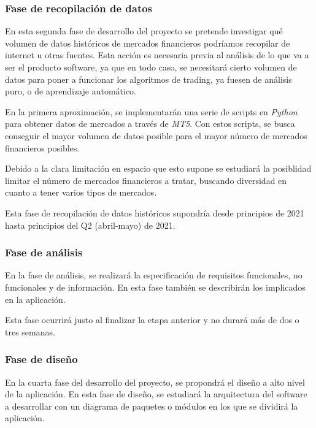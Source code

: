 \subsubsection{Fase de recopilación de datos}

En esta segunda fase de desarrollo del proyecto se pretende investigar qué volumen de datos históricos de mercados financieros podríamos recopilar de internet u otras fuentes. Esta acción es necesaria previa al análisis de lo que va a ser el producto software, ya que en todo caso, se necesitará cierto volumen de datos para poner a funcionar los algoritmos de trading, ya fuesen de análisis puro, o de aprendizaje automático. \newline

En la primera aproximación, se implementarán una serie de scripts en \textit{Python} para obtener datos de mercados a través de \textit{MT5}. Con estos scripts, se busca conseguir el mayor volumen de datos posible para el mayor número de mercados financieros posibles. \newline

Debido a la clara limitación en espacio que esto supone se estudiará la posiblidad limitar el número de mercados financieros a tratar, buscando diversidad en cuanto a tener varios tipos de mercados. \newline

Esta fase de recopilación de datos históricos supondría desde principios de 2021 hasta principios del Q2 (abril-mayo) de 2021.

\subsubsection{Fase de análisis}

En la fase de análisis, se realizará la especificación de requisitos funcionales, no funcionales y de información. En esta fase también se describirán los implicados en la aplicación. \newline

Esta fase ocurrirá justo al finalizar la etapa anterior y no durará más de dos o tres semanas.

\subsubsection{Fase de diseño}

En la cuarta fase del desarrollo del proyecto, se propondrá el diseño a alto nivel de la aplicación. En esta fase de diseño, se estudiará la arquitectura del software a desarrollar con un diagrama de paquetes o módulos en los que se dividirá la aplicación. \newline

